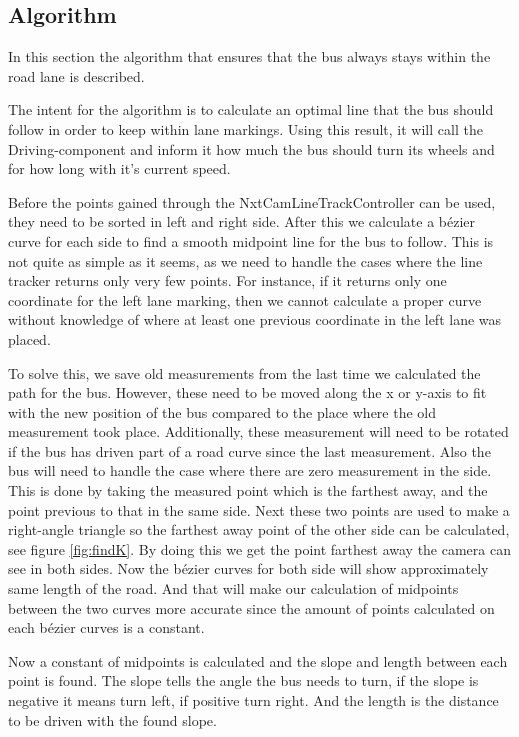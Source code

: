 \subsection{Algorithm}
In this section the algorithm that ensures that the bus always stays within the road lane is described. 

The intent for the algorithm is to calculate an optimal line that the bus should follow in order to keep within lane markings. Using this result, it will call the Driving-component and inform it how much the bus should turn its wheels and for how long with it's current speed. 

Before the points gained through the NxtCamLineTrackController can be used, they need to be sorted in left and right side. After this we calculate a bézier curve for each side to find a smooth midpoint line for the bus to follow. This is not quite as simple as it seems, as we need to handle the cases where the line tracker returns only very few points. For instance, if it returns only one coordinate for the left lane marking, then we cannot calculate a proper curve without knowledge of where at least one previous coordinate in the left lane was placed. 

To solve this, we save old measurements from the last time we calculated the path for the bus. However, these need to be moved along the x or y-axis to fit with the new position of the bus compared to the place where the old measurement took place. Additionally, these measurement will need to be rotated if the bus has driven part of a road curve since the last measurement. Also the bus will need to handle the case where there are zero measurement in the side. This is done by taking the measured point which is the farthest away, and the point previous to that in the same side. Next these two points are used to make a right-angle triangle so the farthest away point of the other side can be calculated, see figure \ref{fig:findK}. By doing this we get the point farthest away the camera can see in both sides. Now the bézier curves for both side will show approximately same length of the road. And that will make our calculation of midpoints between the two curves more accurate since the amount of points calculated on each bézier curves is a constant.

Now a constant of midpoints is calculated and the slope and length between each point is found. The slope tells the angle the bus needs to turn, if the slope is negative it means turn left, if positive turn right. And the length is the distance to be driven with the found slope. 



